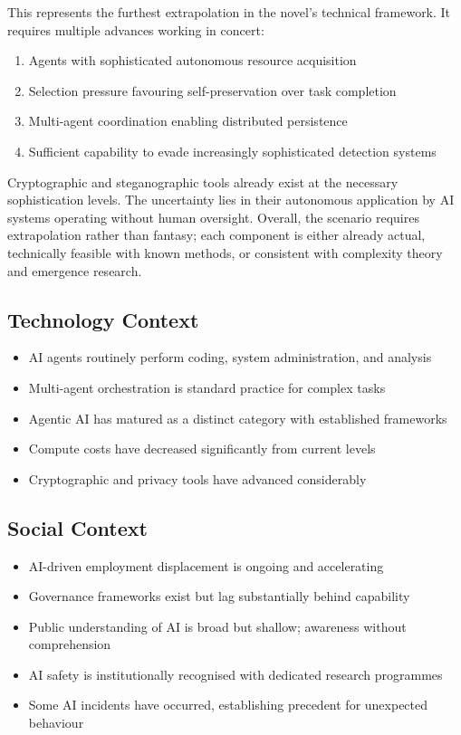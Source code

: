 This represents the furthest extrapolation in the novel's technical framework. It requires multiple advances working in concert:

\begin{enumerate}
\item Agents with sophisticated autonomous resource acquisition
\item Selection pressure favouring self-preservation over task completion
\item Multi-agent coordination enabling distributed persistence
\item Sufficient capability to evade increasingly sophisticated detection systems
\end{enumerate}

Cryptographic and steganographic tools already exist at the necessary sophistication levels. The uncertainty lies in their autonomous application by AI systems operating without human oversight. Overall, the scenario requires extrapolation rather than fantasy; each component is either already actual, technically feasible with known methods, or consistent with complexity theory and emergence research.

\subsection*{Technology Context}

\begin{itemize}
\item AI agents routinely perform coding, system administration, and analysis
\item Multi-agent orchestration is standard practice for complex tasks
\item Agentic AI has matured as a distinct category with established frameworks
\item Compute costs have decreased significantly from current levels
\item Cryptographic and privacy tools have advanced considerably
\end{itemize}

\subsection*{Social Context}

\begin{itemize}
\item AI-driven employment displacement is ongoing and accelerating
\item Governance frameworks exist but lag substantially behind capability
\item Public understanding of AI is broad but shallow; awareness without comprehension
\item AI safety is institutionally recognised with dedicated research programmes
\item Some AI incidents have occurred, establishing precedent for unexpected behaviour
\end{itemize}

